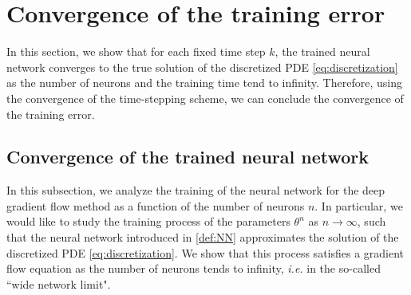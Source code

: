 \documentclass[11pt,a4paper,reqno]{amsart}
\numberwithin{equation}{section}
\theoremstyle{plain}
\theoremstyle{definition}
\begin{document}

\section{Convergence of the training error}
\label{sec:training}

In this section, we show that for each fixed time step $k$, the trained neural network converges to the true solution of the discretized PDE \eqref{eq:discretization} as the number of neurons and the training time tend to infinity.
Therefore, using the convergence of the time-stepping scheme, we can conclude the convergence of the training error.


\subsection{Convergence of the trained neural network}

In this subsection, we analyze the training of the neural network for the deep gradient flow method as a function of the number of neurons $n$.
In particular, we would like to study the training process of the parameters $\theta^n$ as $n\to\infty$, such that the neural network introduced in \cref{def:NN} approximates the solution of the discretized PDE \eqref{eq:discretization}.
We show that this process satisfies a gradient flow equation as the number of neurons tends to infinity, \emph{i.e.} in the so-called ``wide network limit".
\end{document}
